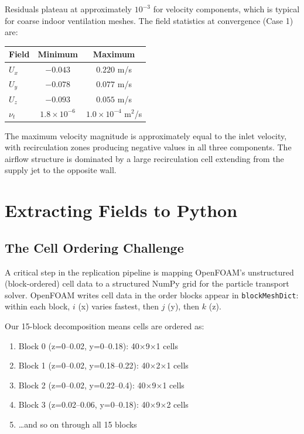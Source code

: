 \documentclass[12pt]{article}
\begin{document}
Residuals plateau at approximately $10^{-3}$ for velocity components, which is typical for coarse indoor ventilation meshes. The field statistics at convergence (Case 1) are:

\begin{center}
\begin{tabular}{lcc}
\toprule
Field & Minimum & Maximum \\
\midrule
$U_x$ & $-0.043$ & $0.220$ m/s \\
$U_y$ & $-0.078$ & $0.077$ m/s \\
$U_z$ & $-0.093$ & $0.055$ m/s \\
$\nu_t$ & $1.8 \times 10^{-6}$ & $1.0 \times 10^{-4}$ m$^2$/s \\
\bottomrule
\end{tabular}
\end{center}

The maximum velocity magnitude is approximately equal to the inlet velocity, with recirculation zones producing negative values in all three components. The airflow structure is dominated by a large recirculation cell extending from the supply jet to the opposite wall.

\section{Extracting Fields to Python}

\subsection{The Cell Ordering Challenge}

A critical step in the replication pipeline is mapping OpenFOAM's unstructured (block-ordered) cell data to a structured NumPy grid for the particle transport solver. OpenFOAM writes cell data in the order blocks appear in \texttt{blockMeshDict}: within each block, $i$ (x) varies fastest, then $j$ (y), then $k$ (z).

Our 15-block decomposition means cells are ordered as:
\begin{enumerate}
    \item Block 0 (z=0--0.02, y=0--0.18): 40$\times$9$\times$1 cells
    \item Block 1 (z=0--0.02, y=0.18--0.22): 40$\times$2$\times$1 cells
    \item Block 2 (z=0--0.02, y=0.22--0.4): 40$\times$9$\times$1 cells
    \item Block 3 (z=0.02--0.06, y=0--0.18): 40$\times$9$\times$2 cells
    \item \ldots and so on through all 15 blocks
\end{enumerate}
\end{document}
